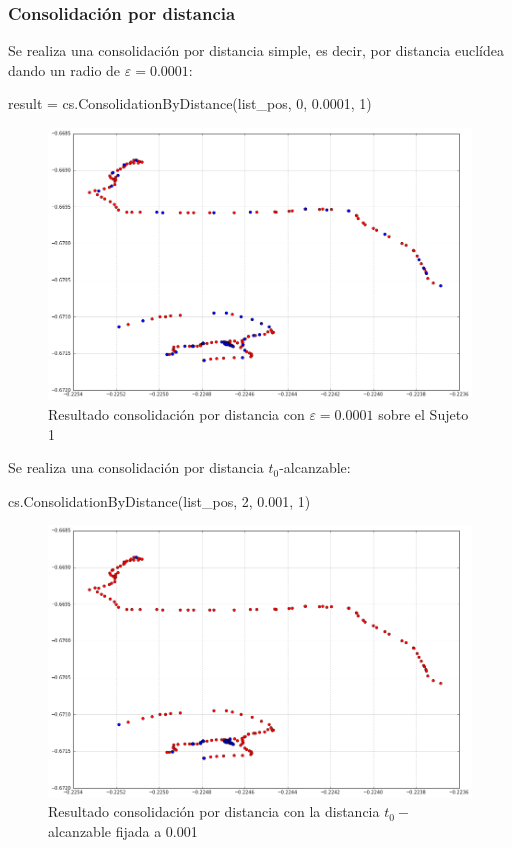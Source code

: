 \documentclass[a4paper, 12pt]{article}
\begin{document}
\pagebreak
\subsubsection{Consolidaci\'on por distancia}

Se realiza una consolidaci\'on por distancia simple, es decir, por distancia eucl\'idea dando un radio de $\varepsilon = 0.0001$:\\

\begin{python}
result = cs.ConsolidationByDistance(list_pos, 0, 0.0001, 1)
\end{python}

\begin{figure}[H]
	\includegraphics[scale=.45]{../comparativa/byTimeSuj1.png}
	\caption{Resultado consolidaci\'on por distancia con $\varepsilon=0.0001$ sobre el Sujeto 1}
\end{figure}

Se realiza una consolidaci\'on por distancia $t_0$-alcanzable:

\begin{python}
cs.ConsolidationByDistance(list_pos, 2, 0.001, 1)
\end{python}


\begin{figure}[H]
	\includegraphics[scale=.45]{../comparativa/t0Sujet1.png}
	\caption{Resultado consolidaci\'on por distancia con la distancia $t_0-$alcanzable fijada a 0.001}
\end{figure}
\end{document}
